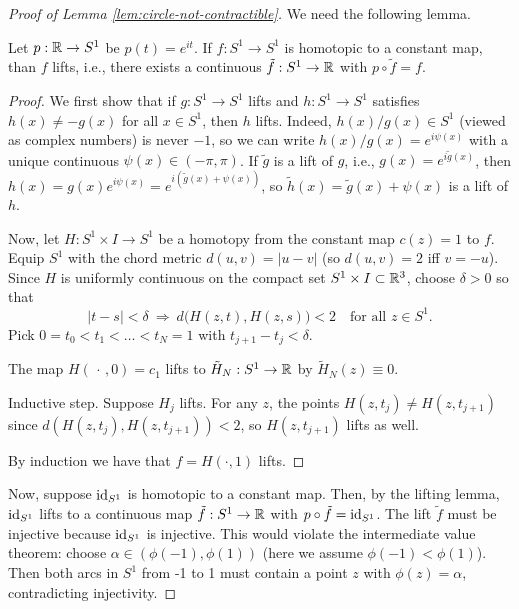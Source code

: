 \begin{proof}[Proof of Lemma \ref{lem:circle-not-contractible}]
  We need the following lemma.
  \begin{lemma}
  Let $p:\mathbb{R}\to S^{1}$ be $p(t)=e^{it}$. If $f:S^{1}\to S^{1}$ is homotopic to a constant map, than $f$ lifts, i.e., there exists a continuous $\tilde f:S^{1}\to\mathbb{R}$ with $p\circ\tilde f=f$.
  \end{lemma}
  \begin{proof}
We first show that if $g:S^1\to S^1$ lifts and $h:S^1\to S^1$ satisfies $h(x)\neq -g(x)$ for all $x\in S^1$, then $h$ lifts. Indeed, $h(x)/g(x)\in S^1$ (viewed as complex numbers) is never $-1$, so we can write $h(x)/g(x)=e^{i\psi(x)}$ with a unique continuous $\psi(x)\in(-\pi,\pi)$. If $\tilde g$ is a lift of $g$, i.e., $g(x)=e^{i\tilde g(x)}$, then $h(x)=g(x)e^{i\psi(x)}=e^{i(\tilde g(x)+\psi(x))}$, so $\tilde h(x)=\tilde g(x)+\psi(x)$ is a lift of $h$.


Now, let $H:S^{1}\times I\to S^{1}$ be a homotopy from the constant map $c(z)=1$ to $f$. Equip $S^{1}$ with the chord metric $d(u,v)=|u-v|$ (so $d(u,v)=2$ iff $v=-u$). Since $H$ is uniformly continuous on the compact set $S^{1}\times I\subset\mathbb{R}^3$, choose $\delta>0$ so that
  \[
  |t-s|<\delta\ \Longrightarrow\ d\big(H(z,t),H(z,s)\big)<2\quad\text{for all }z\in S^{1}.
  \]
  Pick $0=t_0<t_1<\dots<t_N=1$ with $t_{j+1}-t_j<\delta$.

  The map $H(\,\cdot\,,0)=c_{1}$ lifts to $\tilde H_N:S^{1}\to\mathbb{R}$ by $\tilde H_N(z)\equiv 0$.

  Inductive step. Suppose $H_{j}$ lifts. For any $z$, the points
  $H(z,t_j)\neq H(z,t_{j+1})$ since $d(H(z,t_j),H(z,t_{j+1}))<2$, so $H(z,t_{j+1})$ lifts as well.

  By induction we have that $f=H(\cdot, 1)$ lifts.
  \end{proof}

  Now, suppose $\text{id}_{S^1}$ is homotopic to a constant map. Then, by the lifting lemma, $\text{id}_{S^1}$ lifts to a continuous map $\tilde f:S^1\to \mathbb{R}$ with $p\circ \tilde f=\text{id}_{S^1}$. The lift $\tilde f$ must be injective because $\text{id}_{S^1}$ is injective. This would violate the intermediate value theorem: choose $\alpha\in (\phi(-1),\phi(1))$ (here we assume $\phi(-1)<\phi(1)$). Then both arcs in $S^1$ from -1 to 1 must contain a point $z$ with $\phi(z)=\alpha$, contradicting injectivity. 
\end{proof}

